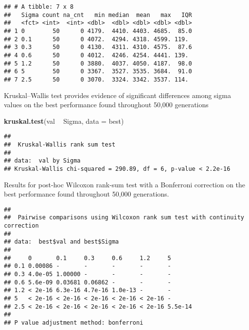 \documentclass[]{book}
\newenvironment{Shaded}{\begin{snugshade}}{\end{snugshade}}
\newcommand{\DataTypeTok}[1]{\textcolor[rgb]{0.13,0.29,0.53}{#1}}
\newcommand{\KeywordTok}[1]{\textcolor[rgb]{0.13,0.29,0.53}{\textbf{#1}}}
\newcommand{\NormalTok}[1]{#1}
\newcommand{\OperatorTok}[1]{\textcolor[rgb]{0.81,0.36,0.00}{\textbf{#1}}}
\newcommand{\OtherTok}[1]{\textcolor[rgb]{0.56,0.35,0.01}{#1}}
\newcommand{\StringTok}[1]{\textcolor[rgb]{0.31,0.60,0.02}{#1}}
\begin{document}
\begin{verbatim}
## # A tibble: 7 x 8
##   Sigma count na_cnt   min median  mean   max   IQR
##   <fct> <int>  <int> <dbl>  <dbl> <dbl> <dbl> <dbl>
## 1 0        50      0 4179.  4410. 4403. 4685.  85.0
## 2 0.1      50      0 4072.  4294. 4318. 4599. 119. 
## 3 0.3      50      0 4130.  4311. 4310. 4575.  87.6
## 4 0.6      50      0 4012.  4246. 4254. 4441. 139. 
## 5 1.2      50      0 3880.  4037. 4050. 4187.  98.0
## 6 5        50      0 3367.  3527. 3535. 3684.  91.0
## 7 2.5      50      0 3070.  3324. 3342. 3537. 114.
\end{verbatim}

Kruskal--Wallis test provides evidence of significant differences among sigma values on the best performance found throughout 50,000 generations

\begin{Shaded}
\begin{Highlighting}[]
\KeywordTok{kruskal.test}\NormalTok{(val }\OperatorTok{~}\StringTok{ }\NormalTok{Sigma, }\DataTypeTok{data =}\NormalTok{ best)}
\end{Highlighting}
\end{Shaded}

\begin{verbatim}
## 
##  Kruskal-Wallis rank sum test
## 
## data:  val by Sigma
## Kruskal-Wallis chi-squared = 290.89, df = 6, p-value < 2.2e-16
\end{verbatim}

Results for post-hoc Wilcoxon rank-sum test with a Bonferroni correction on the best performance found throughout 50,000 generations.

\begin{Shaded}
\end{Shaded}

\begin{verbatim}
## 
##  Pairwise comparisons using Wilcoxon rank sum test with continuity correction 
## 
## data:  best$val and best$Sigma 
## 
##     0       0.1     0.3     0.6     1.2     5      
## 0.1 0.00086 -       -       -       -       -      
## 0.3 4.0e-05 1.00000 -       -       -       -      
## 0.6 5.6e-09 0.03681 0.06862 -       -       -      
## 1.2 < 2e-16 6.3e-16 4.7e-16 1.0e-13 -       -      
## 5   < 2e-16 < 2e-16 < 2e-16 < 2e-16 < 2e-16 -      
## 2.5 < 2e-16 < 2e-16 < 2e-16 < 2e-16 < 2e-16 5.5e-14
## 
## P value adjustment method: bonferroni
\end{verbatim}
\end{document}
